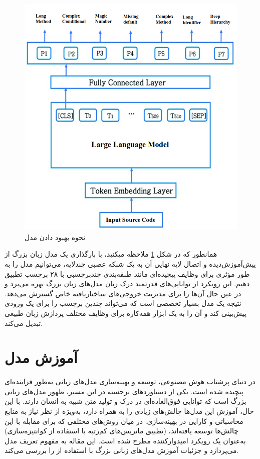 \begin{figure}[H]
	\centering
	\includegraphics[width=1\textwidth]{figures/finetune.png}
	\caption{نحوه بهبود دادن مدل}
	\label{fig:finetune}
\end{figure}

همانطور که در شکل \ref{fig:finetune} ملاحظه میکنید،
با بارگذاری یک مدل زبان بزرگ از پیش‌آموزش‌دیده و اتصال لایه نهایی آن به یک شبکه عصبی چندلایه، می‌توانیم مدل را به طور مؤثری برای وظایف پیچیده‌ای مانند طبقه‌بندی چند‌برچسبی با ۲۸ برچسب تطبیق دهیم. این رویکرد از توانایی‌های قدرتمند درک زبان مدل‌های زبان بزرگ بهره می‌برد و در عین حال آن‌ها را برای مدیریت خروجی‌های ساختاریافته خاص گسترش می‌دهد. نتیجه یک مدل بسیار تخصصی است که می‌تواند چندین برچسب را برای یک ورودی پیش‌بینی کند و آن را به یک ابزار همه‌کاره برای وظایف مختلف پردازش زبان طبیعی تبدیل می‌کند.\cite{j2024finetuningllmenterprise}

\section{آموزش مدل}

در دنیای پرشتاب هوش مصنوعی، توسعه و بهینه‌سازی مدل‌های زبانی به‌طور فزاینده‌ای پیچیده شده است. یکی از دستاوردهای برجسته در این مسیر، ظهور مدل‌های زبانی بزرگ  است که توانایی فوق‌العاده‌ای در درک و تولید متن شبیه به انسان دارند. با این حال، آموزش این مدل‌ها چالش‌های زیادی را به همراه دارد، به‌ویژه از نظر نیاز به منابع محاسباتی و کارایی در بهینه‌سازی. در میان روش‌های مختلفی که برای مقابله با این چالش‌ها توسعه یافته‌اند، (تطبیق ماتریس‌های کم‌رتبه با استفاده از کوانتیزه‌سازی) به‌عنوان یک رویکرد امیدوارکننده مطرح شده است. این مقاله به مفهوم تعریف مدل می‌پردازد و جزئیات آموزش مدل‌های زبانی بزرگ با استفاده از  را بررسی می‌کند.

